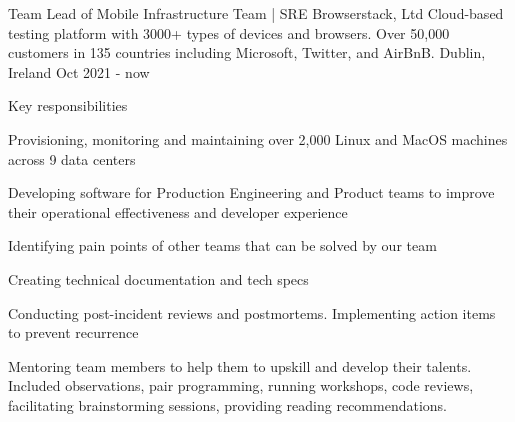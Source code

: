 

\begin{cventries}

    \cventry
    {Team Lead of Mobile Infrastructure Team | SRE} %
    {Browserstack, Ltd} %
    {Cloud-based testing platform with 3000+ types of devices and browsers. Over 50,000 customers in 135 countries including Microsoft, Twitter, and AirBnB.} %
    {Dublin, Ireland} %
    {Oct 2021 - now} %
    {
        \begin{cvitems}{Key responsibilities}
            \item {Provisioning, monitoring and maintaining over 2,000 Linux and MacOS machines across 9 data centers}
            \item {Developing software for Production Engineering and Product teams to improve their operational effectiveness and developer experience}
            \item {Identifying pain points of other teams that can be solved by our team}
            \item {Creating technical documentation and tech specs}
            \item {Conducting post-incident reviews and postmortems. Implementing action items to prevent recurrence}
            \item {Mentoring team members to help them to upskill and develop their talents. Included observations, pair programming, running workshops, code reviews, facilitating brainstorming sessions, providing reading recommendations.}

\end{cvitems}}
\end{cventries}
